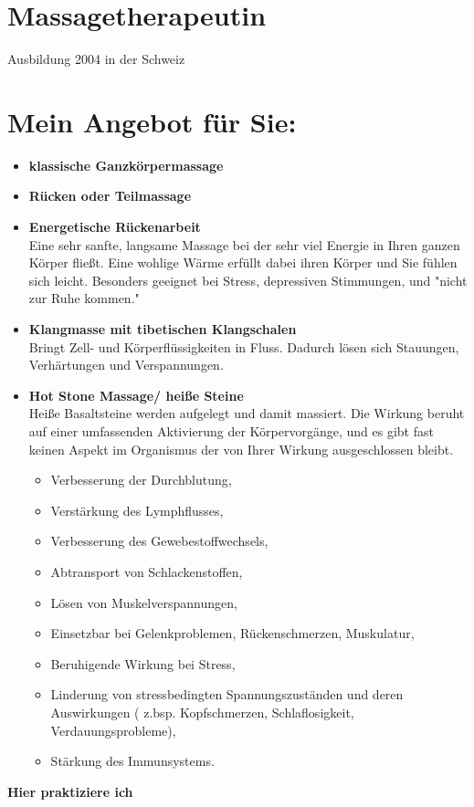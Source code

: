\documentclass[10pt,foldmark,notumble]{leaflet}
\begin{document}
\newpage

\section{Massagetherapeutin}
Ausbildung 2004 in der Schweiz

\section{Mein Angebot für Sie:}

\begin{itemize}
\item {\bf klassische Ganzkörpermassage} \\
\item  {\bf Rücken oder Teilmassage} \\               
\item  {\bf Energetische Rückenarbeit}\\                
Eine sehr sanfte, langsame Massage bei der sehr viel Energie in Ihren ganzen Körper fließt. Eine wohlige Wärme erfüllt dabei ihren Körper und Sie fühlen sich leicht. Besonders geeignet bei Stress, depressiven Stimmungen, und "nicht zur Ruhe kommen."\\
\item  {\bf Klangmasse mit tibetischen Klangschalen}\\
Bringt Zell- und Körperflüssigkeiten in Fluss. Dadurch lösen sich Stauungen, Verhärtungen und Verspannungen.\\
\item  {\bf Hot Stone Massage/ heiße Steine}\\
Heiße Basaltsteine werden aufgelegt und damit massiert. Die Wirkung beruht auf einer umfassenden Aktivierung der Körpervorgänge, und es gibt fast keinen Aspekt im Organismus der von Ihrer Wirkung ausgeschlossen bleibt.\\
\begin{itemize}
\item Verbesserung der Durchblutung,
\item Verstärkung des Lymphflusses, 
\item Verbesserung des Gewebestoffwechsels,
\item Abtransport von Schlackenstoffen,
\item Lösen von Muskelverspannungen,
\item Einsetzbar bei Gelenkproblemen, Rückenschmerzen, Muskulatur,
\item Beruhigende Wirkung bei Stress,
\item Linderung von stressbedingten Spannungszuständen und deren Auswirkungen ( z.bsp. Kopfschmerzen, Schlaflosigkeit, Verdauungsprobleme), 
\item Stärkung des Immunsystems.
\end{itemize}
\end{itemize}
%
\newpage
\vspace*{15mm}
\centerline {\LARGE {\bf {Hier praktiziere ich}}}
\end{document}
